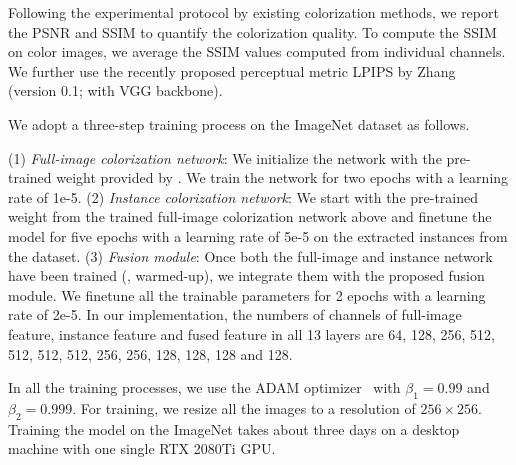 Following the experimental protocol by existing colorization methods, we report the PSNR and SSIM to quantify the colorization quality.
To compute the SSIM on color images, we average the SSIM values computed from individual channels.
We further use the recently proposed perceptual metric LPIPS by Zhang~\etal~\cite{zhang-CVPR-2018} (version 0.1; with VGG backbone).

We adopt a three-step training process on the ImageNet dataset as follows.

(1) \emph{Full-image colorization network}: We initialize the network with the pre-trained weight provided by \cite{Zhang-SIGGRAPH-2017}. We train the network for two epochs with a learning rate of 1e-5. 
(2) \emph{Instance colorization network}: We start with the pre-trained weight from the trained full-image colorization network above and finetune the model for five epochs with a learning rate of 5e-5 on the extracted instances from the dataset. 
(3) \emph{Fusion module}: Once both the full-image and instance network have been trained (\ie, warmed-up), we integrate them with the proposed fusion module. 
We finetune all the trainable parameters for 2 epochs with a learning rate of 2e-5. 
In our implementation, the numbers of channels of full-image feature, instance feature and fused feature in all 13 layers are 64, 128, 256, 512, 512, 512, 512, 256, 256, 128, 128, 128 and 128.

In all the training processes, we use the ADAM optimizer~\cite{kingma2014adam} with $\beta_1 = 0.99$ and $\beta_2= 0.999$. 
For training, we resize all the images to a resolution of $256\times256$. 
Training the model on the ImageNet takes about three days on a desktop machine with one single RTX 2080Ti GPU.


